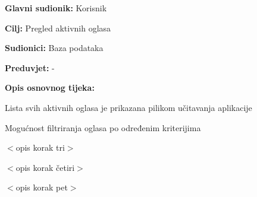 					\noindent {}
					\begin{packed_item}
	
						\item \textbf{Glavni sudionik: }Korisnik
						\item  \textbf{Cilj:} Pregled aktivnih oglasa
						\item  \textbf{Sudionici:} Baza podataka
						\item  \textbf{Preduvjet:} -
						\item  \textbf{Opis osnovnog tijeka:}
						
						\item[] \begin{packed_enum}
	
							\item Lista svih aktivnih oglasa je prikazana pilikom učitavanja aplikacije
							\item Mogućnost filtriranja oglasa po određenim kriterijima
							\item $<$opis korak tri$>$
							\item $<$opis korak četiri$>$
							\item $<$opis korak pet$>$
						\end{packed_enum}

					\end{packed_item}
					
